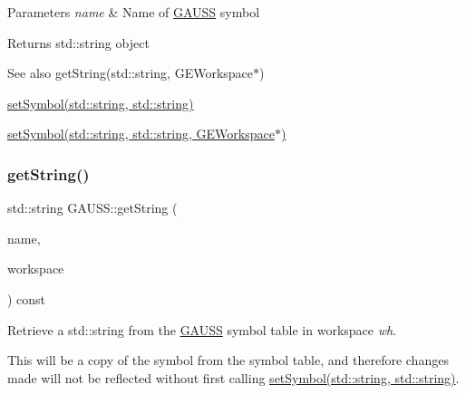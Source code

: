 \begin{DoxyParams}{Parameters}
{\em name} & Name of \hyperlink{class_g_a_u_s_s}{G\+A\+U\+SS} symbol \\
\hline
\end{DoxyParams}
\begin{DoxyReturn}{Returns}
std\+::string object
\end{DoxyReturn}
\begin{DoxySeeAlso}{See also}
get\+String(std\+::string, G\+E\+Workspace$\ast$) 

\hyperlink{class_g_a_u_s_s_aa37c658d30c98dd8e38a8ce682083a10}{set\+Symbol(std\+::string, std\+::string)} 

\hyperlink{class_g_a_u_s_s_a7bf4d629d539c1cba827ec59220b4659}{set\+Symbol(std\+::string, std\+::string, G\+E\+Workspace$\ast$)} 
\end{DoxySeeAlso}
\mbox{\label{class_g_a_u_s_s_a7eb018ed1e0c4743db2c5e5d323f7757}} 
\subsubsection{\texorpdfstring{get\+String()}{getString()}\hspace{0.1cm}{\footnotesize\ttfamily [2/2]}}
{\footnotesize\ttfamily std\+::string G\+A\+U\+S\+S\+::get\+String (\begin{DoxyParamCaption}\item[{std\+::string}]{name,  }\item[{\hyperlink{class_g_e_workspace}{G\+E\+Workspace} $\ast$}]{workspace }\end{DoxyParamCaption}) const}



Retrieve a std\+::string from the \hyperlink{class_g_a_u_s_s}{G\+A\+U\+SS} symbol table in workspace {\itshape wh}. 

This will be a copy of the symbol from the symbol table, and therefore changes made will not be reflected without first calling \hyperlink{class_g_a_u_s_s_aa37c658d30c98dd8e38a8ce682083a10}{set\+Symbol(std\+::string, std\+::string)}.


